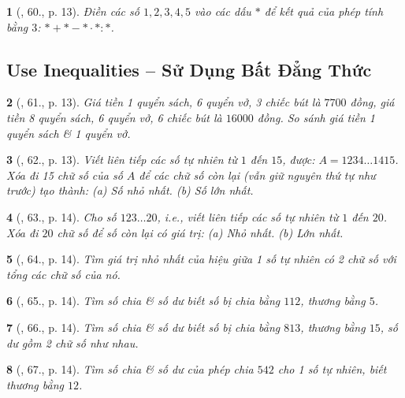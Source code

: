 \documentclass{article}
\newtheorem{baitoan}{}
\begin{document}
\begin{baitoan}[\cite{Binh_Toan_6_tap_1}, 60., p. 13]
	Điền các số $1,2,3,4,5$ vào các dấu $*$ để kết quả của phép tính bằng $3$: $*+*-*\cdot*:*$.
\end{baitoan}

\subsection{Use Inequalities -- Sử Dụng Bất Đẳng Thức}

\begin{baitoan}[\cite{Binh_Toan_6_tap_1}, 61., p. 13]
	Giá tiền 1 quyển sách, 6 quyển vở, 3 chiếc bút là $7700$ đồng, giá tiền 8 quyển sách, 6 quyển vở, 6 chiếc bút là $16000$ đồng. So sánh giá tiền 1 quyển sách \& 1 quyển vở.
\end{baitoan}

\begin{baitoan}[\cite{Binh_Toan_6_tap_1}, 62., p. 13]
	Viết liên tiếp các số tự nhiên từ $1$ đến $15$, được: $A = 1234\ldots1415$. Xóa đi 15 chữ số của số $A$ để các chữ số còn lại (vẫn giữ nguyên thứ tự như trước) tạo thành: (a) Số nhỏ nhất. (b) Số lớn nhất.
\end{baitoan}

\begin{baitoan}[\cite{Binh_Toan_6_tap_1}, 63., p. 14]
	Cho số $123\ldots20$, i.e., viết liên tiếp các số tự nhiên từ $1$ đến $20$. Xóa đi $20$ chữ số để số còn lại có giá trị: (a) Nhỏ nhất. (b) Lớn nhất.
\end{baitoan}

\begin{baitoan}[\cite{Binh_Toan_6_tap_1}, 64., p. 14]
	Tìm giá trị nhỏ nhất của hiệu giữa 1 số tự nhiên có 2 chữ số với tổng các chữ số của nó.
\end{baitoan}

\begin{baitoan}[\cite{Binh_Toan_6_tap_1}, 65., p. 14]
	Tìm số chia \& số dư biết số bị chia bằng $112$, thương bằng $5$.
\end{baitoan}

\begin{baitoan}[\cite{Binh_Toan_6_tap_1}, 66., p. 14]
	Tìm số chia \& số dư biết số bị chia bằng $813$, thương bằng $15$, số dư gồm 2 chữ số như nhau.
\end{baitoan}

\begin{baitoan}[\cite{Binh_Toan_6_tap_1}, 67., p. 14]
	Tìm số chia \& số dư của phép chia $542$ cho 1 số tự nhiên, biết thương bằng $12$.
\end{baitoan}
\end{document}
